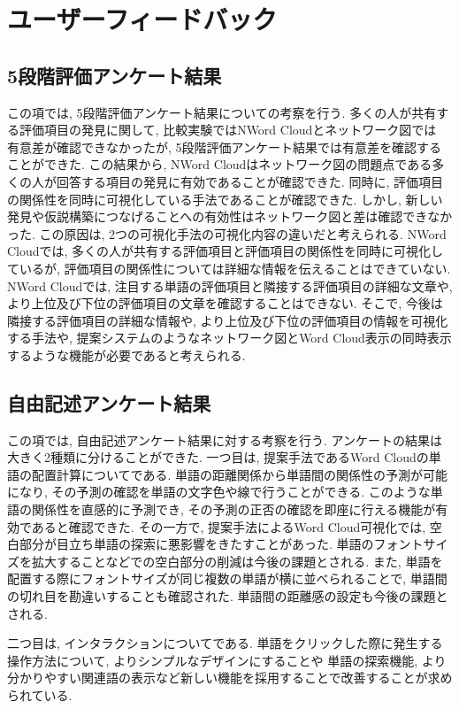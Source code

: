 \documentclass[syuuron]{kuee}
\begin{document}
	\section{ユーザーフィードバック}
		\subsection{5段階評価アンケート結果}
		この項では, 5段階評価アンケート結果についての考察を行う. 
		多くの人が共有する評価項目の発見に関して, 比較実験ではNWord Cloudとネットワーク図では
		有意差が確認できなかったが, 5段階評価アンケート結果では有意差を確認することができた. 
		この結果から, NWord Cloudはネットワーク図の問題点である多くの人が回答する項目の発見に有効であることが確認できた. 
		同時に, 評価項目の関係性を同時に可視化している手法であることが確認できた. 
		しかし, 新しい発見や仮説構築につなげることへの有効性はネットワーク図と差は確認できなかった. 
		この原因は, 2つの可視化手法の可視化内容の違いだと考えられる. 
		NWord Cloudでは, 多くの人が共有する評価項目と評価項目の関係性を同時に可視化しているが, 
		評価項目の関係性については詳細な情報を伝えることはできていない. 
		NWord Cloudでは, 注目する単語の評価項目と隣接する評価項目の詳細な文章や, 
		より上位及び下位の評価項目の文章を確認することはできない. 
		そこで, 今後は隣接する評価項目の詳細な情報や, より上位及び下位の評価項目の情報を可視化する手法や, 
		提案システムのようなネットワーク図とWord Cloud表示の同時表示するような機能が必要であると考えられる. 
		
		\subsection{自由記述アンケート結果}
		この項では, 自由記述アンケート結果に対する考察を行う. 
		アンケートの結果は大きく2種類に分けることができた. 
		一つ目は, 提案手法であるWord Cloudの単語の配置計算についてである. 
		単語の距離関係から単語間の関係性の予測が可能になり, その予測の確認を単語の文字色や線で行うことができる. 
		このような単語の関係性を直感的に予測でき, その予測の正否の確認を即座に行える機能が有効であると確認できた. 
		その一方で, 提案手法によるWord Cloud可視化では, 空白部分が目立ち単語の探索に悪影響をきたすことがあった. 
		単語のフォントサイズを拡大することなどでの空白部分の削減は今後の課題とされる. 
		また, 単語を配置する際にフォントサイズが同じ複数の単語が横に並べられることで, 
		単語間の切れ目を勘違いすることも確認された. 単語間の距離感の設定も今後の課題とされる. 
	
		二つ目は, インタラクションについてである. 
		単語をクリックした際に発生する操作方法について, よりシンプルなデザインにすることや
		単語の探索機能, より分かりやすい関連語の表示など新しい機能を採用することで改善することが求められている. 
		
\end{document}
